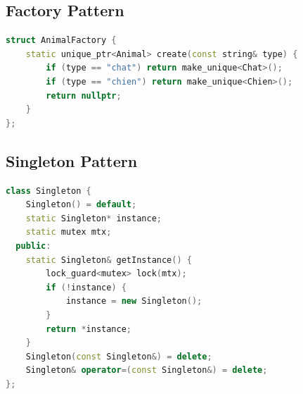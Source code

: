 \documentclass{article}
\begin{document}
\begin{multicols*}{3}
\subsection*{Factory Pattern}
\begin{lstlisting}[language=C++]
struct AnimalFactory {
    static unique_ptr<Animal> create(const string& type) {
        if (type == "chat") return make_unique<Chat>();
        if (type == "chien") return make_unique<Chien>();
        return nullptr;
    }
};
\end{lstlisting}

\subsection*{Singleton Pattern}
\begin{lstlisting}[language=C++]
class Singleton {
    Singleton() = default;
    static Singleton* instance;
    static mutex mtx;
  public:
    static Singleton& getInstance() {
        lock_guard<mutex> lock(mtx);
        if (!instance) {
            instance = new Singleton();
        }
        return *instance;
    }
    Singleton(const Singleton&) = delete;
    Singleton& operator=(const Singleton&) = delete;
}; \end{lstlisting}


\end{multicols*}
\end{document}
